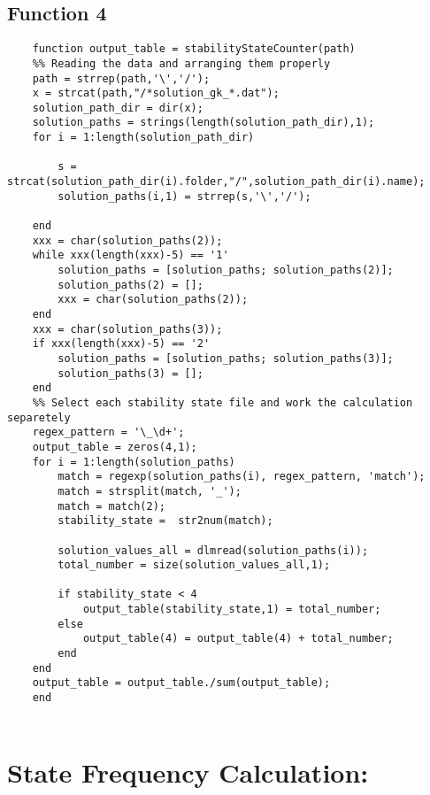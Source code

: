 \documentclass{article}
\begin{document}
\subsection*{Function 4}
\begin{verbatim}
    function output_table = stabilityStateCounter(path)
    %% Reading the data and arranging them properly
    path = strrep(path,'\','/');
    x = strcat(path,"/*solution_gk_*.dat");
    solution_path_dir = dir(x);
    solution_paths = strings(length(solution_path_dir),1);
    for i = 1:length(solution_path_dir)
        
        s = strcat(solution_path_dir(i).folder,"/",solution_path_dir(i).name);
        solution_paths(i,1) = strrep(s,'\','/');
        
    end
    xxx = char(solution_paths(2));
    while xxx(length(xxx)-5) == '1'
        solution_paths = [solution_paths; solution_paths(2)];
        solution_paths(2) = [];
        xxx = char(solution_paths(2));
    end
    xxx = char(solution_paths(3));
    if xxx(length(xxx)-5) == '2'
        solution_paths = [solution_paths; solution_paths(3)];
        solution_paths(3) = [];
    end
    %% Select each stability state file and work the calculation separetely
    regex_pattern = '\_\d+';
    output_table = zeros(4,1);
    for i = 1:length(solution_paths)
        match = regexp(solution_paths(i), regex_pattern, 'match');
        match = strsplit(match, '_');
        match = match(2);
        stability_state =  str2num(match);
        
        solution_values_all = dlmread(solution_paths(i));
        total_number = size(solution_values_all,1);
        
        if stability_state < 4
            output_table(stability_state,1) = total_number;
        else
            output_table(4) = output_table(4) + total_number;
        end
    end
    output_table = output_table./sum(output_table);
    end
    
\end{verbatim}

\section*{State Frequency Calculation:}
\end{document}
